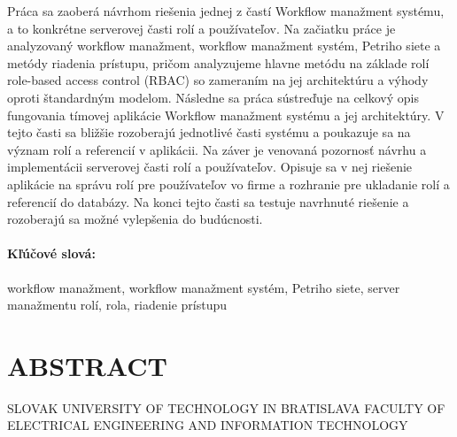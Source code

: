 \documentclass[12pt, oneside]{book}
\begin{document}
\noindent Práca sa zaoberá návrhom riešenia jednej z častí Workflow manažment systému, a to konkrétne serverovej časti rolí a používateľov.
 Na začiatku práce je analyzovaný workflow manažment, workflow manažment systém, Petriho siete a metódy riadenia prístupu, pričom analyzujeme hlavne metódu na základe rolí role-based access control (RBAC) so zameraním na jej architektúru a výhody oproti štandardným modelom.
Následne sa práca sústreďuje na celkový opis fungovania tímovej aplikácie Workflow manažment systému a jej architektúry. V tejto časti sa bližšie rozoberajú jednotlivé časti systému a poukazuje sa na význam rolí a referencií v aplikácii.
 Na záver je venovaná pozornosť návrhu a implementácii serverovej časti rolí a používateľov. Opisuje sa v nej riešenie aplikácie na správu rolí pre používateľov vo firme a rozhranie pre ukladanie rolí a referencií do databázy. Na konci tejto časti sa testuje navrhnuté riešenie a rozoberajú sa možné vylepšenia do budúcnosti.

 
\paragraph*{Kľúčové slová:} 
	 workflow manažment, workflow manažment systém, Petriho siete, server manažmentu rolí, rola, riadenie prístupu

\newpage
\pagestyle{empty}	
\section*{\fontsize{21pt}{1.3}\selectfont ABSTRACT}
 
	\noindent SLOVAK UNIVERSITY OF TECHNOLOGY IN BRATISLAVA
	\newline
	{\fontsize{11pt}{1.3}\selectfont FACULTY OF ELECTRICAL ENGINEERING AND INFORMATION TECHNOLOGY\\ }
	
\end{document}

